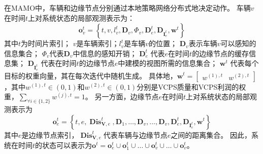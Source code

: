 在MAMO中，车辆和边缘节点分别通过本地策略网络分布式地决定动作。
车辆$v$在时间$t$上对系统状态的局部观测表示为：
	\begin{equation}
		\boldsymbol{o}_{v}^{t}=\left\{t, v, l_{v}^t, \mathbf{D}_{v}, \Phi_{v}, \mathbf{D}_{e}^{t}, \mathbf{D}_{\mathbf{I}_e^t}, \boldsymbol{w}^{t}\right\}
	\end{equation} 
\noindent 其中$t$为时间片索引；
$v$是车辆索引；$l_{v}^t$是车辆$v$的位置；
$\mathbf{D}_{v}$表示车辆$v$可以感知的信息集合；
$\Phi_{v}$代表$\mathbf{D}_{v}$中信息的感知开销；
$\mathbf{D}_{e}^{t}$ 代表$e$在时间$t$的边缘节点的缓存信息集；
$\mathbf{D}_{\mathbf{I}_e^t}$ 代表在时间$t$的边缘节点$e$中建模的视图所需的信息集合；
$\boldsymbol{w}^{t}$ 代表每个目标的权重向量，其在每次迭代中随机生成。
具体地，$\boldsymbol{w}^{t} = \begin{bmatrix}  w^{(1), t}  &  w^{(2), t} \end{bmatrix}$，其中$w^{(1), t} \in (0, 1)$和$w^{(2), t} \in (0, 1)$分别是VCPS质量和VCPS利润的权重，$\sum_{\forall i \in \{1, 2\}} w^{(j), t} = 1$。
另一方面，边缘节点$e$在时间$t$上对系统状态的局部观测表示为
\begin{equation}
	\boldsymbol{o}_{e}^{t}=\left\{t, e, \operatorname{\mathbf{Dis}}_{\mathbf{V}, e}^{t}, \mathbf{D}_{1}, \ldots, \mathbf{D}_{v}, \ldots, \mathbf{D}_{v}, \mathbf{D}_{e}^{t}, \mathbf{D}_{\mathbf{I}_e^t}, \boldsymbol{w}^{t} \right\}
\end{equation}
\noindent 其中$e$是边缘节点索引，$\operatorname{\mathbf{Dis}}_{\mathbf{V}, e}^{t}$代表车辆与边缘节点$e$之间的距离集合。
因此，系统在时间$t$的状态可以表示为$\boldsymbol{o}^{t}=\boldsymbol{o}_{e}^{t} \cup \boldsymbol{o}_{1}^{t} \cup \ldots \cup \boldsymbol{o}_{v}^{t} \cup \ldots \cup \boldsymbol{o}_{v}^{t}$。

